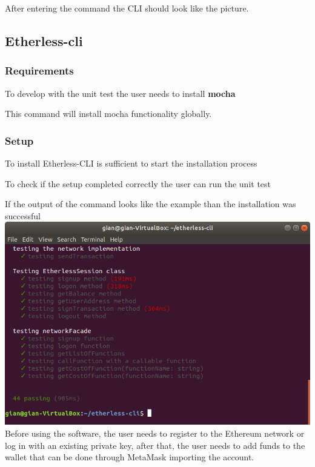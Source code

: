 After entering the command the CLI should look like the picture.

\subsection{Etherless-cli}
\subsubsection{Requirements}
To develop with the unit test the user needs to install \textbf{mocha}
\begin{center}
\end{center}
This command will install mocha functionality globally.

\subsubsection{Setup}
To install Etherless-CLI is sufficient to start the installation process
\begin{center}
\end{center} 

To check if the setup completed correctly the user can run the unit test
\begin{center}
\end{center}

If the output of the command looks like the example than the installation was successful
\includegraphics[width=\textwidth]{res/img/npmruntest.png}
Before using the software, the user needs to register to the Ethereum network or log in with an existing private key, after that, the user needs to add funds to the wallet that can be done through MetaMask importing the account.
